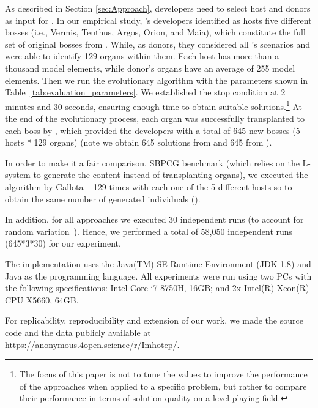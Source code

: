 As described in Section \ref{sec:Approach}, developers need to select host and donors as input for \ApproachName. In our empirical study,  \CaseStudy{}'s developers identified as hosts five different bosses (i.e., Vermis, Teuthus, Argos, Orion, and Maia), which constitute the full set of original bosses from \CaseStudy{}. While, as donors, they considered all \CaseStudy{}'s scenarios and were able to identify 129 organs within them. 
Each host has more than a thousand model elements, while donor's organs have an average of 255 model elements.
Then we run the \ApproachName evolutionary algorithm  with the parameters shown in Table~\ref{tab:evaluation_parameters}. We established the stop condition at 2 minutes and 30 seconds, ensuring enough time to obtain suitable solutions.\footnote{The focus of this paper is not to tune the values to improve the performance of the approaches when applied to a specific problem, but rather to compare their performance in terms of solution quality on a level playing field.} At the end of the evolutionary process, each organ was successfully transplanted to each boss by \ApproachName{}, which provided the developers with a total of 645 new bosses (5 hosts * 129 organs) (note we obtain 645 solutions from \simhotep{} and 645  from \timhotep{}). 

In order to make it a fair comparison, SBPCG benchmark (which relies on the L-system to generate the content instead of transplanting organs), we executed the algorithm by Gallota \etal~\cite{gallotta2022evolving} 129 times with each one of the 5 different hosts so to obtain the same number of generated individuals (). 

In addition, for all approaches we executed 30 independent runs (to account for random variation~\cite{arcuri2013parameter}).  Hence, we performed a total of 58,050 independent runs (645*3*30) for our experiment.

The implementation uses the Java(TM) SE Runtime Environment (JDK 1.8) and Java as the programming language. All experiments were run using two PCs with the following specifications: Intel Core i7-8750H, 16GB; and  2x Intel(R) Xeon(R) CPU X5660, 64GB.

For replicability, reproducibility and extension of our work, we made the source code and the data publicly available at \url{https://anonymous.4open.science/r/Imhotep/}.

